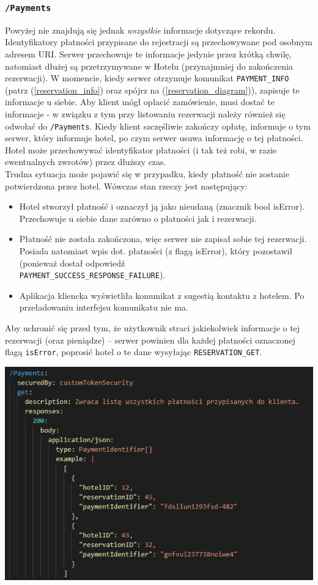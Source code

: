 \documentclass{article}
\begin{document}
\subsubsection{\texttt{/Payments}} \label{payments}
Powyżej nie znajdują się jednak \textit{wszystkie} informacje dotyczące rekordu. Identyfikatory płatności przypisane do rejestracji są przechowywane pod osobnym adresem URI. Serwer przechowuje te informacje jedynie przez krótką chwilę, natomiast dłużej są przetrzymywane w Hotelu (przynajmniej do zakończenia rezerwacji). W momencie, kiedy serwer otrzymuje komunikat \texttt{PAYMENT\_INFO} (patrz (\ref{reservation_info}) oraz spójrz na (\ref{reservation_diagram})), zapisuje te informacje u siebie. Aby klient mógł opłacić zamówienie, musi dostać te informacje - w związku z tym przy listowaniu rezerwacji należy również się odwołać do \texttt{/Payments}. Kiedy klient szczęśliwie zakończy opłatę, informuje o tym serwer, który informuje hotel, po czym serwer usuwa informację o tej płatności. Hotel może przechowywać identyfikator płatności (i tak też robi, w razie ewentualnych zwrotów) przez dłuższy czas.\\
\indent Trudna sytuacja może pojawić się w przypadku, kiedy płatność nie zostanie potwierdzona przez hotel. Wówczas stan rzeczy jest następujący:
\begin{itemize}
    \item Hotel stworzył płatność i oznaczył ją jako nieudaną (znacznik bool isError). Przechowuje u siebie dane zarówno o płatności jak i rezerwacji.
    \item Płatność nie została zakończona, więc serwer nie zapisał sobie tej rezerwacji. Posiada natomiast wpis dot. płatności (z flagą isError), który pozostawił (ponieważ dostał odpowiedź\\ \texttt{PAYMENT\_SUCCESS\_RESPONSE\_FAILURE}).
    \item Aplikacja kliencka wyświetliła komunikat z sugestią kontaktu z hotelem. Po przeładowaniu interfejsu komunikatu nie ma.
\end{itemize}
Aby uchronić się przed tym, że użytkownik straci jakiekolwiek informacje o tej rezerwacji (oraz pieniądze) – serwer powinien dla każdej płatności oznaczonej flagą \texttt{isError}, poprosić hotel o te dane wysyłając \texttt{RESERVATION\_GET}.

\includegraphics[width=\linewidth]{Rezerwacje/paymentsGET.jpg}
\end{document}
